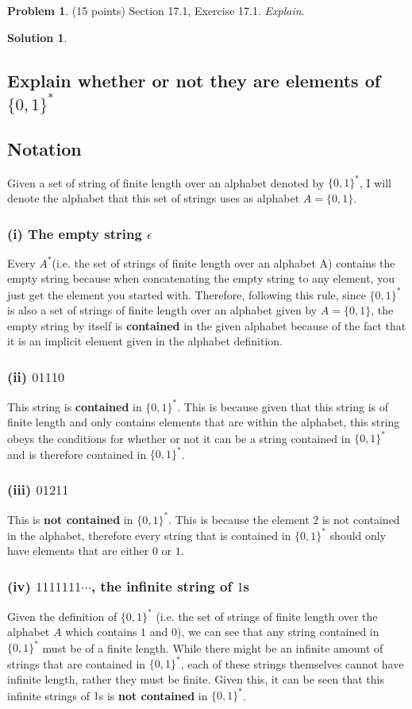 \documentclass{article}
\theoremstyle{definition}
\newtheorem{problem}{Problem}
\newtheorem*{solution}{Solution}
\begin{document}
\newpage
\begin{problem} (15 points) Section 17.1, Exercise 17.1. \textit{Explain}. 
\end{problem}
\begin{solution}
\hspace{1cm}
\subsection*{Explain whether or not they are elements of $\{0,1\}^*$}
\hspace{1cm}
\subsection*{Notation}
Given a set of string of finite length over an alphabet denoted by $\{0,1\}^*$, I will denote the alphabet that this set of strings uses as alphabet $A = \{0,1\}$.
\subsubsection*{(i) The empty string $\epsilon$}
Every $A^*$(i.e. the set of strings of finite length over an alphabet A) contains the empty string because when concatenating the empty string to any element, you just get the element you started with. Therefore, following this rule, since $\{0,1\}^*$ is also a set of strings of finite length over an alphabet given by $A = \{0,1\}$, the empty string by itself is  \textbf{contained} in the given alphabet because of the fact that it is an implicit element given in the alphabet definition.
\subsubsection*{(ii) $01110$}
This string is \textbf{contained} in $\{0,1\}^*$. This is because given that this string is of finite length and only contains elements that are within the alphabet, this string obeys the conditions for whether or not it can be a string contained in $\{0,1\}^*$ and is therefore contained in $\{0,1\}^*$.
\subsubsection*{(iii) $01211$}
This is \textbf{not contained} in $\{0,1\}^*$. This is because the element $2$ is not contained in the alphabet, therefore every string that is contained in $\{0,1\}^*$ should only have elements that are either $0$ or $1$.
\subsubsection*{(iv) $1111111 \cdots$, the infinite string of $1$s}
Given the definition of $\{0,1\}^*$ (i.e. the set of strings of finite length over the alphabet $A$ which contains $1$ and $0$), we can see that any string contained in $\{0,1\}^*$ must be of a finite length. While there might be an infinite amount of strings that are contained in $\{0,1\}^*$, each of these strings themselves cannot have infinite length, rather they must be finite. Given this, it can be seen that this infinite strings of $1$s is \textbf{not contained} in $\{0,1\}^*$.
\end{solution}
\end{document}
